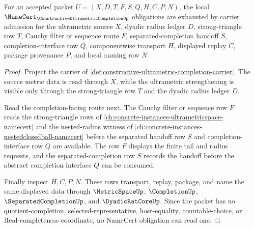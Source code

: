 \begin{theorem}
\label{thm:constructive-ultrametric-completion-namecert-obligations}
For an accepted packet $U=(X,D,T,F,S,Q,H,C,P,N)$, the local $\NameCert_{\ConstructiveUltrametricCompletionUp}$ obligations are exhausted by carrier admission for the ultrametric source $X$, dyadic radius ledger $D$, strong-triangle row $T$, Cauchy filter or sequence route $F$, separated-completion handoff $S$, completion-interface row $Q$, componentwise transport $H$, displayed replay $C$, package provenance $P$, and local naming row $N$.
\end{theorem}
\begin{proof}
Project the carrier of \autoref{def:constructive-ultrametric-completion-carrier}. The source metric data is read through $X$, while the ultrametric strengthening is visible only through the strong-triangle row $T$ and the dyadic radius ledger $D$.

Read the completion-facing route next. The Cauchy filter or sequence row $F$ reads the strong-triangle rows of \autoref{ch:concrete-instances-ultrametricspace-namecert} and the nested-radius witness of \autoref{ch:concrete-instances-nestedclosedball-namecert} before the separated handoff row $S$ and completion-interface row $Q$ are available. The row $F$ displays the finite tail and radius requests, and the separated-completion row $S$ records the handoff before the abstract completion interface $Q$ can be consumed.

Finally inspect $H,C,P,N$. These rows transport, replay, package, and name the same displayed data through $\MetricSpaceUp$, $\CompletionUp$, $\SeparatedCompletionUp$, and $\DyadicRatCoreUp$. Since the packet has no quotient-completion, selected-representative, host-equality, countable-choice, or Real-completeness coordinate, no NameCert obligation can read one.
\end{proof}


